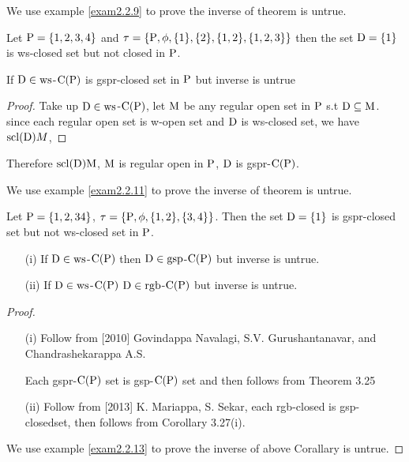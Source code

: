We use example \ref{exam2.2.9} to prove the inverse of theorem is untrue. 

\begin{exm}\label{exam2.2.9}
Let $\mathrm{P}= \{1, 2, 3, 4\}$ and  $\tau= \{\mathrm{P}, \phi, \{1\}, \{2\}, \{1, 2\}, \{1, 2, 3\}\}$ then the set $\mathrm{D} = \{1\}$ is ws-closed set but not closed in $\mathrm{P}$.
\end{exm}

\begin{thm}\label{thm2.2.10}
If $\mathrm{D}\in \mathrm{ws}$-$\mathrm{C}(\mathrm{P})$ is gspr-closed set in $\mathrm{P}$ but inverse is untrue
\end{thm}

\begin{proof}
Take up $\mathrm{D}\in\mathrm{ws}$-$\mathrm{C}(\mathrm{P})$, let $\mathrm{M}$ be any regular open set in $\mathrm{P}$ s.t $\mathrm{D} \subseteq \mathrm{M}$. since each regular open set is w-open set and $\mathrm{D}$ is ws-closed set, we have $\mathrm{scl}(\mathrm{D})M$,
\end{proof}

Therefore $\mathrm{scl}(\mathrm{D})\mathrm{M}$, $\mathrm{M}$ is regular open in $\mathrm{P}$, $\mathrm{D}$ is gspr-$\mathrm{C}(\mathrm{P})$.

We use example \ref{exam2.2.11} to prove the inverse of theorem is untrue.

\begin{exm}\label{exam2.2.11}
Let $\mathrm{P} = \{1, 2, 3 4\}$, $\tau = \{\mathrm{P},\phi,\{1, 2\}, \{3, 4\}\}$. Then the set $\mathrm{D}= \{1\}$ is gspr-closed set but not ws-closed set in $\mathrm{P}$.
\end{exm}

\newpage

\begin{coro}\label{coro2.2.12}
\begin{itemize}
\item[(i)] If $\mathrm{D}\in \mathrm{ws}$-$\mathrm{C}(\mathrm{P})$ then $\mathrm{D}\in \mathrm{gsp}$-$\mathrm{C}(\mathrm{P})$ but inverse is untrue.
\item[(ii)] If $\mathrm{D}\in \mathrm{ws}$-$\mathrm{C}(\mathrm{P})$ $\mathrm{D}\in \mathrm{rgb}$-$\mathrm{C}(\mathrm{P})$ but inverse is untrue.
\end{itemize}
\end{coro}

\begin{proof}
\begin{itemize}
\item[(i)] Follow from [2010] Govindappa Navalagi, S.V. Gurushantanavar, and Chandrashekarappa A.S.

Each gspr-$\mathrm{C}(\mathrm{P})$ set is gsp-$\mathrm{C}(\mathrm{P})$ set and then follows from Theorem 3.25

\item[(ii)] Follow from [2013] K. Mariappa, S. Sekar, \cite{Mariappa} each rgb-closed is gsp-closedset, then follows from Corollary 3.27(i).
\end{itemize}
We use example \ref{exam2.2.13} to prove the inverse of above Corallary is untrue.
\end{proof}

